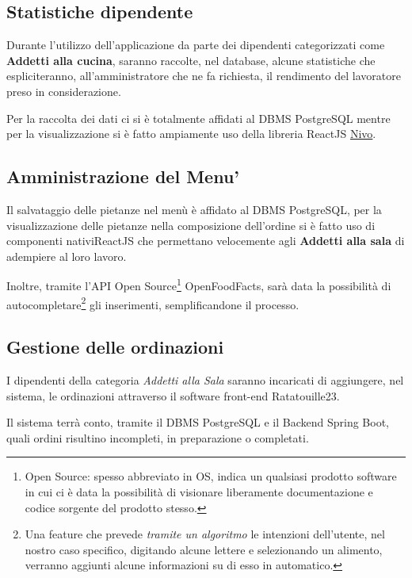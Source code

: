 	\subsection{Statistiche dipendente}
	Durante l'utilizzo dell'applicazione da parte dei dipendenti categorizzati come \textbf{Addetti alla cucina}, saranno
	raccolte, nel database, alcune statistiche che espliciteranno, all'amministratore che ne fa richiesta, il rendimento
	del lavoratore preso in considerazione.

	Per la raccolta dei dati ci si è totalmente affidati al DBMS PostgreSQL mentre per la visualizzazione si è fatto ampiamente uso
	della libreria ReactJS \href{https://nivo.rocks}{Nivo}.

	\newpage
	\subsection{Amministrazione del Menu'}
	Il salvataggio delle pietanze nel menù è affidato al DBMS PostgreSQL, per la visualizzazione delle pietanze nella composizione dell'ordine si è fatto uso
	di componenti nativi\footnotemark ReactJS che permettano velocemente agli \textbf{Addetti alla sala} di adempiere al loro lavoro.
	

	Inoltre, tramite l'API Open Source\footnote{Open Source: spesso abbreviato in OS, indica un qualsiasi prodotto software 
	in cui ci è data la possibilità di visionare liberamente documentazione e codice sorgente del prodotto stesso.} OpenFoodFacts, sarà data
	la possibilità di autocompletare\footnote{Una feature che prevede \textit{tramite un algoritmo} le intenzioni dell'utente, nel nostro caso specifico,
	digitando alcune lettere e selezionando un alimento, verranno aggiunti alcune informazioni su di esso in automatico.} gli inserimenti, semplificandone il processo.

	\subsection{Gestione delle ordinazioni}
	I dipendenti della categoria \textit{Addetti alla Sala} saranno incaricati di aggiungere, nel sistema, le ordinazioni attraverso
	il software front-end Ratatouille23.

	Il sistema terrà conto, tramite il DBMS PostgreSQL e il Backend Spring Boot, quali ordini risultino incompleti, in preparazione o completati.

